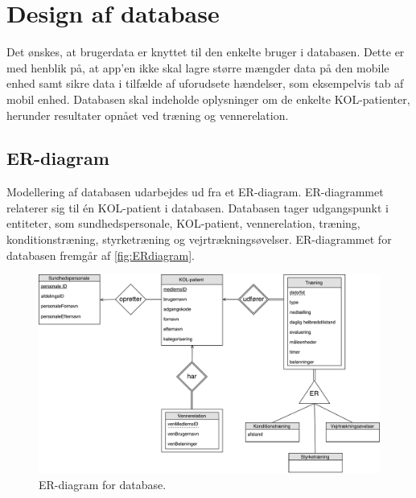\section{Design af database} \label{sec:ER}
Det ønskes, at brugerdata er knyttet til den enkelte bruger i databasen. Dette er med henblik på, at app'en ikke skal lagre større mængder data på den mobile enhed samt sikre data i tilfælde af uforudsete hændelser, som eksempelvis tab af mobil enhed. Databasen skal indeholde oplysninger om de enkelte KOL-patienter, herunder resultater opnået ved træning og vennerelation. 

\subsection{ER-diagram}
Modellering af databasen udarbejdes ud fra et ER-diagram. ER-diagrammet relaterer sig til én KOL-patient i databasen. Databasen tager udgangspunkt i entiteter, som sundhedspersonale, KOL-patient, vennerelation, træning, konditionstræning, styrketræning og vejrtrækningsøvelser. ER-diagrammet for databasen fremgår af \autoref{fig:ERdiagram}.


\begin{figure} [H]
\centering
\includegraphics[width=1\textwidth]{figures/Aktivitetsdiagram/ERdiagram}
\caption{ER-diagram for database.}
\label{fig:ERdiagram}
\end{figure} 


